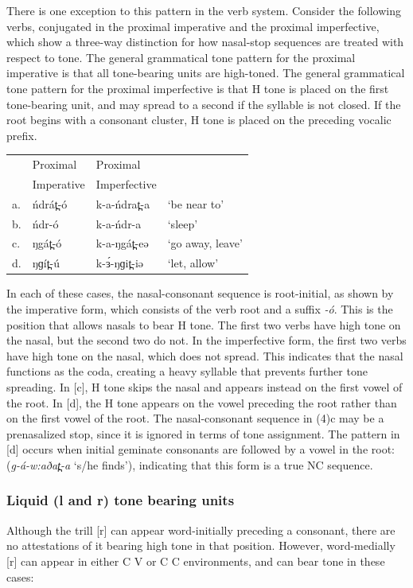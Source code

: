 There is one exception to this pattern in the verb system. Consider the following verbs, conjugated in the proximal imperative and the proximal imperfective, which show a three-way distinction for how nasal-stop sequences are treated with respect to tone. The general grammatical tone pattern for the proximal imperative is that all tone-bearing units are high-toned. The general grammatical tone pattern for the proximal imperfective is that H tone is placed on the first tone-bearing unit, and may spread to a second if the syllable is not closed. If the root begins with a consonant cluster, H tone is placed on the preceding vocalic prefix.

\ea 	\begin{tabular}[t]{llll}
&	Proximal &  Proximal &	 \\
&	Imperative	&Imperfective	&		\\
\midrule
a.	&	ńdrát̪-ó	&	k-a-ńdrat̪-a		&‘be near to’\\
b.	&	ńdr-ó	&	k-a-ńdr-a		&‘sleep’\\
c.	&	ŋgát̪-ó	&	k-a-ŋgát̪-eə		&‘go away, leave’\\
d.	&	ŋɡít̪-ú	&	k-ɜ́-ŋɡit̪-iə		&‘let, allow’\\
	\end{tabular}\z

In each of these cases, the nasal-consonant sequence is root-initial, as shown by the imperative form, which consists of the verb root and a suffix \textit{-ó}. This is the position that allows nasals to bear H tone. The first two verbs have high tone on the nasal, but the second two do not. In the imperfective form, the first two verbs have high tone on the nasal, which does not spread. This indicates that the nasal functions as the coda, creating a heavy syllable that prevents further tone spreading. In [c], H tone skips the nasal and appears instead on the first vowel of the root. In [d], the H tone appears on the vowel preceding the root rather than on the first vowel of the root. The nasal-consonant sequence in (4)c may be a prenasalized stop, since it is ignored in terms of tone assignment. The pattern in [d] occurs when initial geminate consonants are followed by a vowel in the root: (\textit{g-á-w:aðat̪-a} ‘s/he finds’), indicating that this form is a true NC sequence. 


\subsubsection{Liquid (l and r) tone bearing units}	 
Although the trill [r] can appear word-initially preceding a consonant, there are no attestations of it bearing high tone in that position. However, word-medially [r] can appear in either C \underline{\hspace{0.3cm}} V or C\underline{\hspace{0.4cm}} C environments, and can bear tone in these cases:


